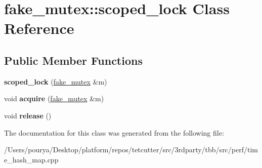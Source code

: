 \hypertarget{classfake__mutex_1_1scoped__lock}{}\section{fake\+\_\+mutex\+:\+:scoped\+\_\+lock Class Reference}
\label{classfake__mutex_1_1scoped__lock}
\subsection*{Public Member Functions}
\begin{DoxyCompactItemize}
\item 
\hypertarget{classfake__mutex_1_1scoped__lock_ad5e67bc7d4dcbf52cfaa37a118bf76b8}{}{\bfseries scoped\+\_\+lock} (\hyperlink{classfake__mutex}{fake\+\_\+mutex} \&m)\label{classfake__mutex_1_1scoped__lock_ad5e67bc7d4dcbf52cfaa37a118bf76b8}

\item 
\hypertarget{classfake__mutex_1_1scoped__lock_a7cb14f4143c6c22ef60ce015d960f6f8}{}void {\bfseries acquire} (\hyperlink{classfake__mutex}{fake\+\_\+mutex} \&m)\label{classfake__mutex_1_1scoped__lock_a7cb14f4143c6c22ef60ce015d960f6f8}

\item 
\hypertarget{classfake__mutex_1_1scoped__lock_a5dd741a4a2836e08512e53252bd9c5fc}{}void {\bfseries release} ()\label{classfake__mutex_1_1scoped__lock_a5dd741a4a2836e08512e53252bd9c5fc}

\end{DoxyCompactItemize}


The documentation for this class was generated from the following file\+:\begin{DoxyCompactItemize}
\item 
/\+Users/pourya/\+Desktop/platform/repos/tetcutter/src/3rdparty/tbb/src/perf/time\+\_\+hash\+\_\+map.\+cpp\end{DoxyCompactItemize}
